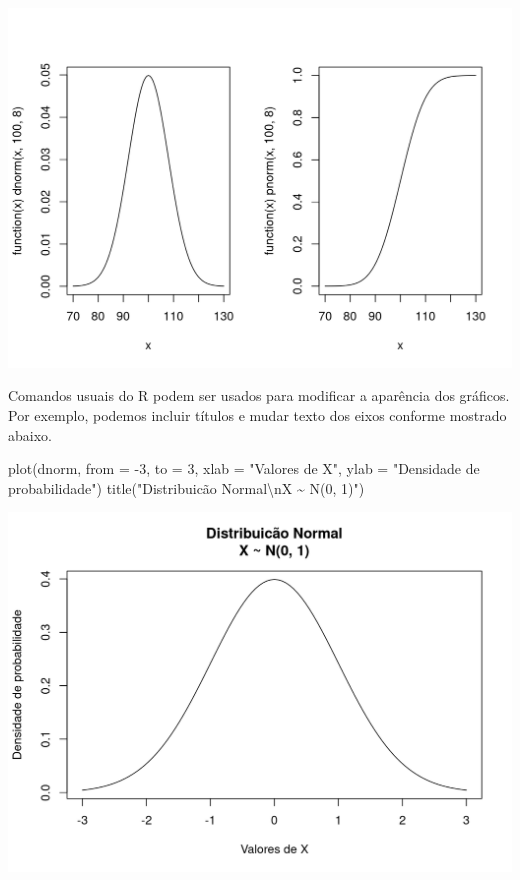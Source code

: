 \documentclass[
  10pt,
  a4paper]{book}
\newenvironment{Shaded}{\begin{snugshade}}{\end{snugshade}}
\newcommand{\AttributeTok}[1]{\textcolor[rgb]{0.77,0.63,0.00}{#1}}
\newcommand{\DecValTok}[1]{\textcolor[rgb]{0.00,0.00,0.81}{#1}}
\newcommand{\FunctionTok}[1]{\textcolor[rgb]{0.00,0.00,0.00}{#1}}
\newcommand{\NormalTok}[1]{#1}
\newcommand{\SpecialCharTok}[1]{\textcolor[rgb]{0.00,0.00,0.00}{#1}}
\newcommand{\StringTok}[1]{\textcolor[rgb]{0.31,0.60,0.02}{#1}}
\begin{document}
\begin{center}\includegraphics{figures/unnamed-chunk-346-1} \end{center}

Comandos usuais do R podem ser usados para modificar a aparência dos
gráficos. Por exemplo, podemos incluir títulos e mudar texto dos eixos
conforme mostrado abaixo.

\begin{Shaded}
\begin{Highlighting}[]
\FunctionTok{plot}\NormalTok{(dnorm, }\AttributeTok{from =} \SpecialCharTok{{-}}\DecValTok{3}\NormalTok{, }\AttributeTok{to =} \DecValTok{3}\NormalTok{,}
     \AttributeTok{xlab =} \StringTok{"Valores de X"}\NormalTok{,}
     \AttributeTok{ylab =} \StringTok{"Densidade de probabilidade"}\NormalTok{)}
\FunctionTok{title}\NormalTok{(}\StringTok{"Distribuicão Normal}\SpecialCharTok{\textbackslash{}n}\StringTok{X \textasciitilde{} N(0, 1)"}\NormalTok{)}
\end{Highlighting}
\end{Shaded}

\begin{center}\includegraphics{figures/unnamed-chunk-347-1} \end{center}
\end{document}
